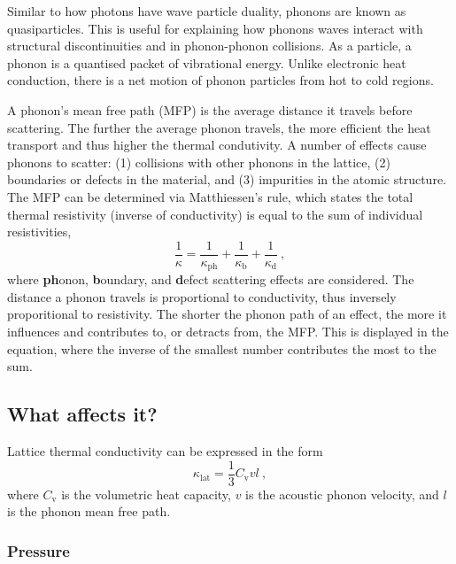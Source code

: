 Similar to how photons have wave particle duality, phonons are known as quasiparticles. This is useful for explaining how phonons waves interact with structural discontinuities and in phonon-phonon collisions. As a particle, a phonon is a quantised packet of vibrational energy. Unlike electronic heat conduction, there is a net motion of phonon particles from hot to cold regions. 

A phonon's mean free path (MFP) is the average distance it travels before scattering. The further the average phonon travels, the more efficient the heat transport and thus higher the thermal condutivity. A number of effects cause phonons to scatter: (1) collisions with other phonons in the lattice, (2) boundaries or defects in the material, and (3) impurities in the atomic structure. The MFP can be determined via Matthiessen's rule, which states the total thermal resistivity (inverse of conductivity) is equal to the sum of individual resistivities,
%
\begin{equation}
\frac{1}{\kappa} = \frac{1}{\kappa_{\mathrm{ph}}} + \frac{1}{\kappa_{\mathrm{b}}} + \frac{1}{\kappa_{\mathrm{d}}}\ ,
\end{equation}
%
where \textbf{ph}onon, \textbf{b}oundary, and \textbf{d}efect scattering effects are considered. The distance a phonon travels is proportional to conductivity, thus inversely proporitional to resistivity. The shorter the phonon path of an effect, the more it influences and contributes to, or detracts from, the MFP. This is displayed in the equation, where the inverse of the smallest number contributes the most to the sum.






\subsection{What affects it?}

Lattice thermal conductivity can be expressed in the form 
%
\begin{equation}
\kappa_{\mathrm{lat}} = \frac{1}{3} C_{\mathrm{v}} v l\ ,
\label{eq.cvvl}
\end{equation}
%
where $C_{\mathrm{v}}$ is the volumetric heat capacity, $v$ is the acoustic phonon velocity, and $l$ is the phonon mean free path.


\subsubsection{Pressure}

